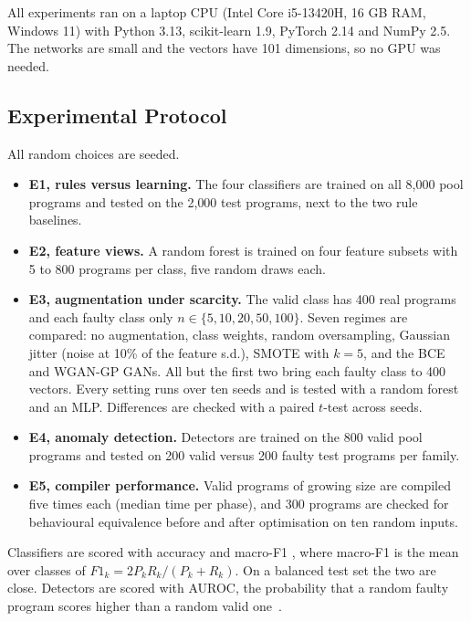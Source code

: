 \documentclass[12pt,a4paper]{article}
\begin{document}
All experiments ran on a laptop CPU (Intel Core i5-13420H, 16 GB RAM, Windows 11) with Python 3.13, scikit-learn 1.9,
PyTorch 2.14 and NumPy 2.5. The networks are small and the vectors have 101 dimensions, so no GPU was needed.

\subsection{Experimental Protocol}

All random choices are seeded.

\begin{itemize}
    \item \textbf{E1, rules versus learning.} The four classifiers are trained on all 8{,}000 pool programs and tested on
    the 2{,}000 test programs, next to the two rule baselines.
    \item \textbf{E2, feature views.} A random forest is trained on four feature subsets with 5 to 800 programs per class,
    five random draws each.
    \item \textbf{E3, augmentation under scarcity.} The valid class has 400 real programs and each faulty class only
    $n\in\{5,10,20,50,100\}$. Seven regimes are compared: no augmentation, class weights, random oversampling, Gaussian
    jitter (noise at 10\% of the feature s.d.), SMOTE with $k=5$, and the BCE and WGAN-GP GANs. All but the first two bring
    each faulty class to 400 vectors. Every setting runs over ten seeds and is tested with a random forest and an MLP.
    Differences are checked with a paired $t$-test across seeds.
    \item \textbf{E4, anomaly detection.} Detectors are trained on the 800 valid pool programs and tested on 200 valid
    versus 200 faulty test programs per family.
    \item \textbf{E5, compiler performance.} Valid programs of growing size are compiled five times each (median time per
    phase), and 300 programs are checked for behavioural equivalence before and after optimisation on ten random inputs.
\end{itemize}

Classifiers are scored with accuracy and macro-F1 \cite{sokolova2009}, where macro-F1 is the mean over classes of
$F1_k=2P_kR_k/(P_k+R_k)$. On a balanced test set the two are close. Detectors are scored with AUROC, the probability that a
random faulty program scores higher than a random valid one~\cite{fawcett2006}.

\end{document}

